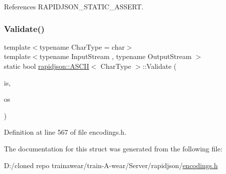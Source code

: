 References R\+A\+P\+I\+D\+J\+S\+O\+N\+\_\+\+S\+T\+A\+T\+I\+C\+\_\+\+A\+S\+S\+E\+RT.

\mbox{\label{structrapidjson_1_1_a_s_c_i_i_a1d92c5e7540766a9fc03bebf788dab88}} 
\subsubsection{\texorpdfstring{Validate()}{Validate()}}
{\footnotesize\ttfamily template$<$typename Char\+Type  = char$>$ \\
template$<$typename Input\+Stream , typename Output\+Stream $>$ \\
static bool \mbox{\hyperlink{structrapidjson_1_1_a_s_c_i_i}{rapidjson\+::\+A\+S\+C\+II}}$<$ Char\+Type $>$\+::Validate (\begin{DoxyParamCaption}\item[{Input\+Stream \&}]{is,  }\item[{Output\+Stream \&}]{os }\end{DoxyParamCaption})\hspace{0.3cm}{\ttfamily [static]}}



Definition at line 567 of file encodings.\+h.


\begin{DoxyCode}{0}

\end{DoxyCode}


The documentation for this struct was generated from the following file\+:\begin{DoxyCompactItemize}
\item 
D\+:/cloned repo trainawear/train-\/\+A-\/wear/\+Server/rapidjson/\mbox{\hyperlink{encodings_8h}{encodings.\+h}}\end{DoxyCompactItemize}
